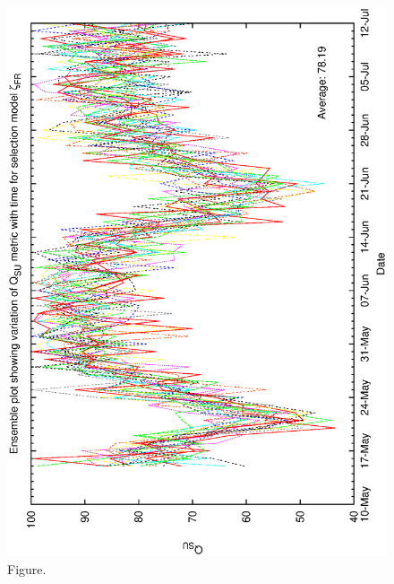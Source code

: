 \documentclass[12pt,a4paper]{article}
\begin{document}
\begin{figure}[htbp]
 \begin{center}
  \includegraphics[scale=1.0, angle=0]{figures/biasfr_ensemble.eps}
 \end{center}
  \caption[Figure.]
{Figure.}
\end{figure}
\clearpage
\end{document}

